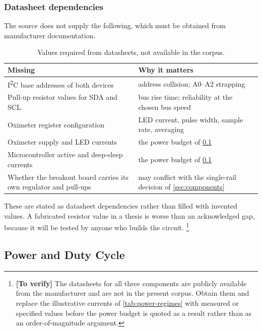 \documentclass[12pt,a4paper,oneside]{report}
\newcommand{\verify}[1]{\footnote{\textbf{[To verify]} #1}}
\begin{document}
\subsubsection{Datasheet dependencies}

The source does not supply the following, which must be obtained from manufacturer documentation.

\begin{table}[htbp]
\centering\small
\caption{Values required from datasheets, not available in the corpus.}\label{tab:datasheet-deps}
\begin{tabularx}{\textwidth}{@{}>{\raggedright\arraybackslash}p{5.6cm} X@{}}
\toprule
\textbf{Missing} & \textbf{Why it matters} \\
\midrule
I\textsuperscript{2}C base addresses of both devices & address collision; A0--A2 strapping \\
Pull-up resistor values for SDA and SCL & bus rise time; reliability at the chosen bus speed \\
Oximeter register configuration & LED current, pulse width, sample rate, averaging \\
Oximeter supply and LED currents & the power budget of \cref{sec:power} \\
Microcontroller active and deep-sleep currents & the power budget of \cref{sec:power} \\
Whether the breakout board carries its own regulator and pull-ups & may conflict with the single-rail decision of \cref{sec:components} \\
\bottomrule
\end{tabularx}
\end{table}

These are stated as datasheet dependencies rather than filled with invented values. A fabricated resistor value in a thesis is worse than an acknowledged gap, because it will be tested by anyone who builds the circuit.%
\verify{The datasheets for all three components are publicly available from the manufacturer and are not in the present corpus. Obtain them and replace the illustrative currents of \cref{tab:power-regimes} with measured or specified values before the power budget is quoted as a result rather than as an order-of-magnitude argument.}

\subsection{Power and Duty Cycle}\label{sec:power}
\end{document}
